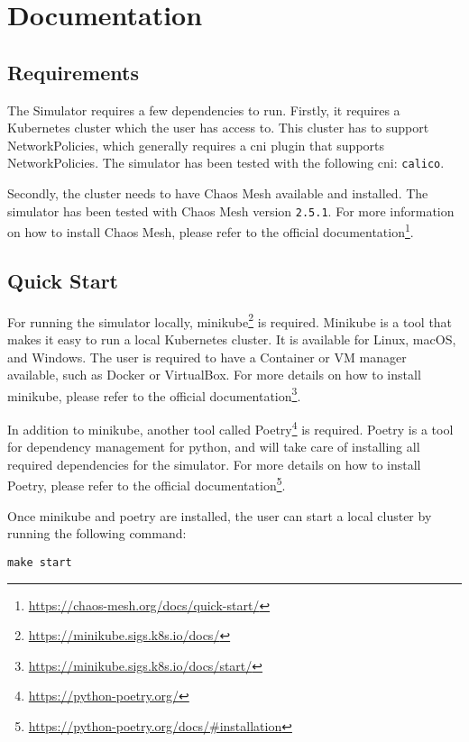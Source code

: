 \chapter{Documentation}
\label{chapter:documentation}

\section{Requirements}
\label{section:requirements}

The Simulator requires a few dependencies to run.
Firstly, it requires a Kubernetes cluster which the user has access to. This cluster has to support NetworkPolicies, which generally requires a \ac{cni} plugin that supports NetworkPolicies. The simulator has been tested with the following \ac{cni}: \verb|calico|.

Secondly, the cluster needs to have Chaos Mesh available and installed. The simulator has been tested with Chaos Mesh version \verb|2.5.1|. For more information on how to install Chaos Mesh, please refer to the official documentation\footnote{\url{https://chaos-mesh.org/docs/quick-start/}}.

\section{Quick Start}

For running the simulator locally, minikube\footnote{\url{https://minikube.sigs.k8s.io/docs/}} is required. Minikube is a tool that makes it easy to run a local Kubernetes cluster. It is available for Linux, macOS, and Windows. The user is required to have a Container or VM manager available, such as Docker or VirtualBox. For more details on how to install minikube, please refer to the official documentation\footnote{\url{https://minikube.sigs.k8s.io/docs/start/}}.

In addition to minikube, another tool called Poetry\footnote{\url{https://python-poetry.org/}} is required. Poetry is a tool for dependency management for python, and will take care of installing all required dependencies for the simulator. For more details on how to install Poetry, please refer to the official documentation\footnote{\url{https://python-poetry.org/docs/\#installation}}.

Once minikube and poetry are installed, the user can start a local cluster by running the following command:

\begin{verbatim}
make start
\end{verbatim}

